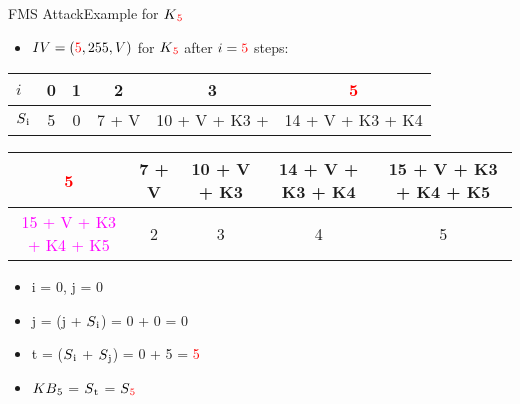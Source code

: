 \documentclass[
	aspectratio=169,	%
	onlytextwidth,		%
	t					%
	]{beamer}
\begin{document}
\begin{frame}[fragile]{FMS Attack}{Example for $K\textsubscript{\textcolor{red}{5}}$}
	\begin{itemize}
		\item $IV = (\textcolor{red}{5},255,V)$ for $K\textsubscript{\textcolor{red}{5}}$ after $i=\textcolor{red}{5}$ steps:
	\end{itemize}

	\small

	\begin{table}[h!]
		\begin{center}
			\begin{tabular}{l|c|c|c|c|c}
			$i$ & 0 & 1 & 2 & 3 & \textcolor{red}{5}\\
			\hline
			$S\textsubscript{i}$ & 5 & 0 & 7 + V & 10 + V + K3 + & 14 + V + K3 + K4\\
			\end{tabular}
		\end{center}
	\end{table}

	\begin{table}[h!]
		\begin{center}
			\begin{tabular}{c|c|c|c|c}
			\textcolor{red}{5} & 7 + V & 10 + V + K3 & 14 + V + K3 + K4 & 15 + V + K3 + K4 + K5\\
			\hline
			\textcolor{magenta}{15 + V + K3 + K4 + K5} & 2 & 3 & 4 & 5\\
			\end{tabular}
		\end{center}
	\end{table}

	\begin{itemize}
		\item i = 0, j = 0
		\item j = (j + $S\textsubscript{i}$) = 0 + 0 = 0
		\item t = ($S\textsubscript{i}$ + $S\textsubscript{j}$) = 0 + 5 = \textcolor{red}{5}
		\item $KB\textsubscript{5}$ = $S\textsubscript{t}$ = $S\textsubscript{\textcolor{red}{5}}$
	\end{itemize}

\end{frame}
\end{document}
